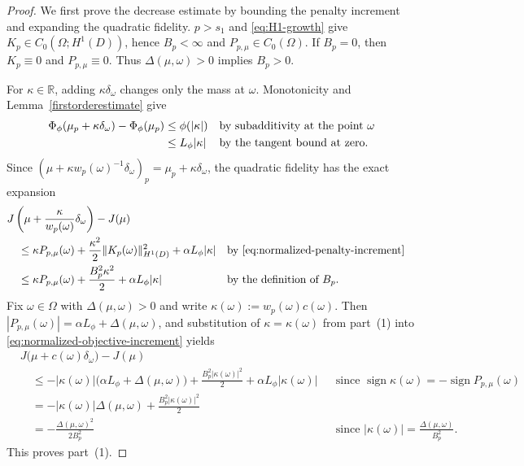 \documentclass[11pt]{amsart}
\theoremstyle{definition}
\theoremstyle{remark}
\DeclareMathOperator{\sign}{sign}
\begin{document}
\begin{proof}
We first prove the decrease estimate by bounding the penalty increment and
expanding the quadratic fidelity.
$p>s_1$ and \eqref{eq:H1-growth} give
$K_p\in C_0(\Omega;H^1(D))$, hence $B_p<\infty$ and
$P_{p,\mu}\in C_0(\Omega)$. If $B_p=0$, then $K_p\equiv0$ and
$P_{p,\mu}\equiv0$. Thus $\Delta(\mu,\omega)>0$ implies $B_p>0$.

For $\kappa\in\mathbb R$, adding $\kappa\delta_\omega$ changes only the
mass at $\omega$. Monotonicity and Lemma~\ref{firstorderestimate} give
\begin{align}
	\Phi_\phi(\mu_p+\kappa\delta_\omega)-\Phi_\phi(\mu_p)
	&\le \phi(|\kappa|)
	&&\text{by subadditivity at the point $\omega$}\notag\\
	&\le L_\phi|\kappa|
	&&\text{by the tangent bound at zero}.
\label{eq:normalized-penalty-increment}
\end{align}
Since $(\mu+\kappa w_p(\omega)^{-1}\delta_\omega)_p
=\mu_p+\kappa\delta_\omega$, the quadratic fidelity has the exact expansion
\begin{align}
	&J\left(\mu+\frac{\kappa}{w_p(\omega)}\delta_\omega\right)
	-J(\mu)\notag\\
	&\quad\le
	\kappa P_{p,\mu}(\omega)
	+\frac{\kappa^2}{2}\|K_p(\omega)\|_{H^1(D)}^2
	+\alpha L_\phi|\kappa|
	&&\text{by \eqref{eq:normalized-penalty-increment}}\notag\\
	&\quad\le
	\kappa P_{p,\mu}(\omega)+\frac{B_p^2\kappa^2}{2}
	+\alpha L_\phi|\kappa|
	&&\text{by the definition of $B_p$}.
\label{eq:normalized-objective-increment}
\end{align}
Fix $\omega\in\Omega$ with $\Delta(\mu,\omega)>0$ and write
$\kappa(\omega):=w_p(\omega)c(\omega)$. Then
$|P_{p,\mu}(\omega)|=\alpha L_\phi+\Delta(\mu,\omega)$, and substitution of
$\kappa=\kappa(\omega)$ from part~(1) into
\eqref{eq:normalized-objective-increment} yields
\begin{align*}
	&J\bigl(\mu+c(\omega)\delta_{\omega}\bigr)
	-J(\mu)\\
	&\quad\le
	-|\kappa(\omega)|\bigl(\alpha L_\phi+\Delta(\mu,\omega)\bigr)
	+\frac{B_p^2|\kappa(\omega)|^2}{2}
	+\alpha L_\phi|\kappa(\omega)|
	&&\text{since $\sign\kappa(\omega)=-\sign P_{p,\mu}(\omega)$}\\
	&\quad=-|\kappa(\omega)|\Delta(\mu,\omega)
	+\frac{B_p^2|\kappa(\omega)|^2}{2}\\
	&\quad=-\frac{\Delta(\mu,\omega)^2}{2B_p^2}
	&&\text{since $|\kappa(\omega)|=\frac{\Delta(\mu,\omega)}{B_p^2}$}.
\end{align*}
This proves part~(1).


\end{proof}
\end{document}
